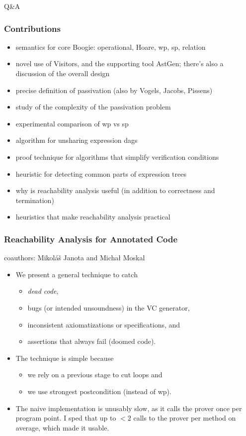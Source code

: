 \documentclass{beamer}
\begin{document}
\begin{frame}
\centerline{\Huge Q\&A}
\end{frame}
\begin{frame}
  \frametitle{Contributions}
  \begin{itemize}
  \item semantics for core Boogie: operational, Hoare, wp, sp, relation
  \item novel use of Visitors, and the supporting tool AstGen; there's
    also a discussion of the overall design
  \item precise definition of passivation (also by Vogels, Jacobs, Pissens)
  \item study of the complexity of the passivation problem
  \item experimental comparison of wp vs sp
  \item algorithm for unsharing expression dags
  \item proof technique for algorithms that simplify verification conditions
  \item heuristic for detecting common parts of expression trees
  \item why is reachability analysis useful (in addition to correctness
    and termination)
  \item heuristics that make reachability analysis practical 
  \end{itemize}
\end{frame}

\begin{frame}
  \frametitle{Reachability Analysis for Annotated Code}
  coauthors: Mikol\'a\v{s} Janota and Micha{\l} Moskal\bigskip
  \begin{itemize}
  \item We present a general technique to catch
    \begin{itemize}
    \item \emph{dead code},
    \item bugs (or intended unsoundness) in the VC generator,
    \item inconsistent axiomatizations or specifications, and
    \item assertions that always fail (doomed code).
    \end{itemize}
  \item The technique is simple because
    \begin{itemize}
    \item we rely on a previous stage to cut loops and
    \item we use strongest postcondition (instead of wp).
    \end{itemize}
  \item The naive implementation is unusably slow, as it calls
    the prover once per program point. I sped that up to $<2$
    calls to the prover per method on average, which made it 
    usable.
  \end{itemize}
\end{frame}
\end{document}
